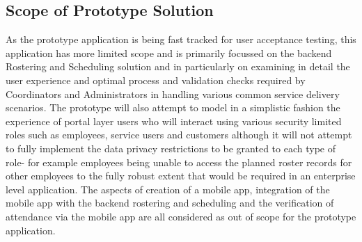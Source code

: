\documentclass[a4paper,12pt]{article}
\begin{document}
\begin{samepage}
\subsection {Scope of Prototype Solution}
As the prototype application is being fast tracked for user acceptance testing, this application has more limited scope and is primarily focussed on the backend Rostering and Scheduling solution and in particularly on examining in detail the user experience and optimal process and validation checks required by Coordinators and Administrators in handling various common service delivery scenarios.
The prototype will also attempt to model in a simplistic fashion the experience of portal layer users who will interact using various security limited roles such as employees, service users and customers although it will not attempt to fully implement the data privacy restrictions to be granted to each type of role- for example employees being unable to access the planned roster records for other employees to the fully robust extent that would be required in an enterprise level application.
The aspects of creation of a mobile app, integration of the mobile app with the backend rostering and scheduling and the verification of attendance via the mobile app are all considered as out of scope for the prototype application.
\end{samepage}
\pagebreak
\end{document}
